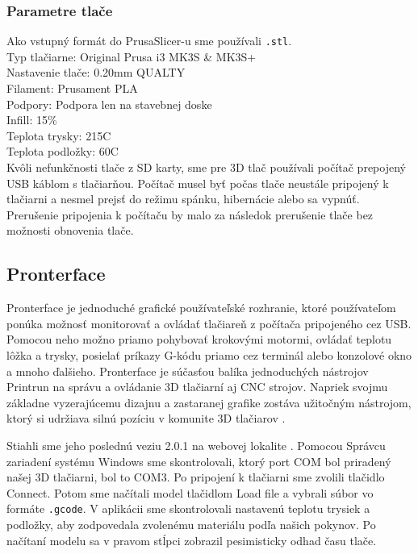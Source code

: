 \subsubsection{Parametre tlače}
Ako vstupný formát do PrusaSlicer-u sme používali \verb|.stl|. \\
Typ tlačiarne: Original Prusa i3 MK3S \& MK3S+ \\
Nastavenie tlače: 0.20mm QUALTY \\
Filament: Prusament PLA \\
Podpory: Podpora len na stavebnej doske \\
Infill: 15\% \\
Teplota trysky: 215\textdegree{}C \\
Teplota podložky: 60\textdegree{}C \\
Kvôli nefunkčnosti tlače z SD karty, sme pre 3D tlač používali počítač prepojený USB káblom s tlačiarňou. Počítač musel byť počas tlače neustále pripojený k tlačiarni a nesmel prejsť do režimu spánku, hibernácie alebo sa vypnúť. Prerušenie pripojenia k počítaču by malo za následok prerušenie tlače bez možnosti obnovenia tlače. 

\subsection{Pronterface}
Pronterface je jednoduché grafické používateľské rozhranie, ktoré používateľom ponúka možnosť monitorovať a ovládať tlačiareň z počítača pripojeného cez USB. Pomocou neho možno priamo pohybovať krokovými motormi, ovládať teplotu lôžka a trysky, posielať príkazy G-kódu priamo cez terminál alebo konzolové okno a mnoho ďalšieho. Pronterface je súčasťou balíka jednoduchých nástrojov Printrun na správu a ovládanie 3D tlačiarní aj CNC strojov. Napriek svojmu základne vyzerajúcemu dizajnu a zastaranej grafike zostáva užitočným nástrojom, ktorý si udržiava silnú pozíciu v komunite 3D tlačiarov \cite{Prontersetup}. 

Stiahli sme jeho poslednú veziu 2.0.1 na webovej lokalite \cite{Pronterface}. Pomocou Správcu zariadení systému Windows sme skontrolovali, ktorý port COM bol priradený našej 3D tlačiarni, bol to COM3. Po pripojení k tlačiarni sme zvolili tlačidlo Connect. Potom sme načítali model tlačidlom Load file a vybrali súbor vo formáte \verb|.gcode|. V aplikácii sme skontrolovali nastavenú teplotu trysiek a podložky, aby zodpovedala zvolenému materiálu podľa našich pokynov. Po načítaní modelu sa v pravom stĺpci zobrazil pesimisticky odhad času tlače.

